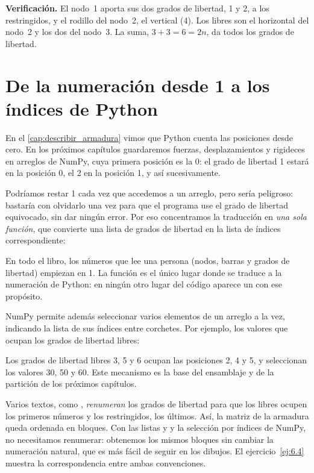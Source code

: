 \textbf{Verificación.} El nodo~1 aporta sus dos grados de libertad, 1 y 2, a
los restringidos, y el rodillo del nodo~2, el vertical (4). Los libres son el
horizontal del nodo~2 y los dos del nodo~3. La suma, $3 + 3 = 6 = 2n$, da
todos los grados de libertad.

\section{De la numeración desde 1 a los índices de Python}\label{sec:indices}

En el \cref{cap:describir_armadura} vimos que Python cuenta las posiciones
desde cero. En los próximos capítulos guardaremos fuerzas, desplazamientos y
rigideces en arreglos de NumPy, cuya primera posición es la 0: el grado de
libertad 1 estará en la posición 0, el 2 en la posición 1, y así
sucesivamente.

Podríamos restar 1 cada vez que accedemos a un arreglo, pero sería
peligroso: bastaría con olvidarlo una vez para que el programa use el grado
de libertad equivocado, sin dar ningún error. Por eso concentramos la
traducción en \emph{una sola función}, que convierte una lista de grados de
libertad en la lista de índices correspondiente:

\begin{recuerda}
En todo el libro, los números que lee una persona (nodos, barras y grados de
libertad) empiezan en 1. La función  es el único lugar donde se
traduce a la numeración de Python: en ningún otro lugar del código aparece un
 con ese propósito.
\end{recuerda}

NumPy permite además seleccionar varios elementos de un arreglo a la vez,
indicando la lista de sus índices entre corchetes. Por ejemplo, los valores
que ocupan los grados de libertad libres:

Los grados de libertad libres 3, 5 y 6 ocupan las posiciones 2, 4 y 5, y
seleccionan los valores 30, 50 y 60. Este mecanismo es la base del
ensamblaje y de la partición de los próximos capítulos.

\begin{parasabermas}
Varios textos, como \textcite{kassimali2012}, \emph{renumeran} los grados de
libertad para que los libres ocupen los primeros números y los restringidos,
los últimos. Así, la matriz de la armadura queda ordenada en bloques. Con las
listas  y  y la selección por índices de NumPy, no
necesitamos renumerar: obtenemos los mismos bloques sin cambiar la
numeración natural, que es más fácil de seguir en los dibujos. El
ejercicio~\ref{ej:6.4} muestra la correspondencia entre ambas convenciones.
\end{parasabermas}

